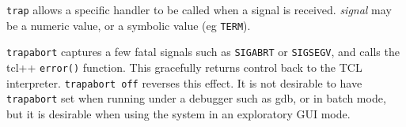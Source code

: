 {\tt trap} allows a specific handler to
be called when a signal is received. {\em signal} may be a numeric
value, or a symbolic value (eg {\tt TERM}).

{\tt trapabort} captures a few fatal signals such as
{\tt SIGABRT} or {\tt SIGSEGV}, and calls the tcl++ {\tt error()}
function. This gracefully returns control back to the TCL
interpreter. {\tt trapabort off} reverses this effect. It is not
desirable to have {\tt trapabort} set when running under a debugger
such as gdb, or in batch mode, but it is desirable when using the
system in an exploratory GUI mode.





